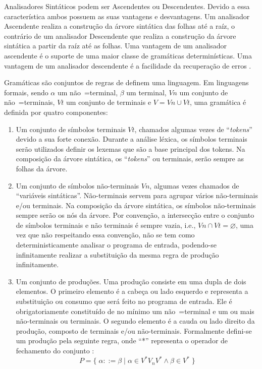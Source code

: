 {    Analisadores Sintáticos podem ser Ascendentes ou Descendentes.
    Devido a essa característica ambos possuem as suas vantagens e
    desvantagens.
    Um analisador Ascendente realiza a construção da árvore sintática das folhas até a raíz,
    o contrário de um analisador Descendente que realiza a construção
    da árvore sintática a partir da raíz até as folhas.
    Uma vantagem de um analisador ascendente é o suporte
    de uma maior classe de gramáticas determinísticas.
    Uma vantagem de um analisador descendente é a facilidade
    da recuperação de erros \cite{ahoCompilerDragonBook}.

    Gramáticas são conjuntos de regras de definem uma linguagem.
    Em linguagens formais,
    sendo $\alpha$ um não~=terminal,
    $\beta$ um terminal,
    $Vn$ um conjunto de não~=terminais,
    $Vt$ um conjunto de terminais e
    $V = Vn \cup Vt$,
    uma gramática é definida por quatro componentes:
    \begin{enumerate}%
        \item Um conjunto de símbolos terminais $Vt$,
        chamados algumas vezes de ``\textit{tokens}'' devido a sua forte conexão.
        Durante a análise léxica,
        os símbolos terminais serão utilizados definir os lexemas que são a base principal dos tokens.
        Na composição da árvore sintática,
        os ``\textit{tokens}'' ou terminais,
        serão sempre as folhas da árvore.

        \item Um conjunto de símbolos não-terminais $Vn$,
        algumas vezes chamados de ``variáveis sintáticas''.
        Não-terminais servem para agrupar vários não-terminais e/ou terminais.
        Na composição da árvore sintática,
        os símbolos não-terminais sempre serão os nós da árvore.
        Por convenção,
        a intersecção entre o conjunto de símbolos terminais e
        não terminais é sempre vazia, i.e., $Vn \cap Vt = \varnothing$,
        uma vez que não respeitando essa convenção,
        não se tem como deterministicamente analisar o programa de entrada,
        podendo-se infinitamente realizar a substituição da mesma regra de produção infinitamente.

        \item \label{definicaoDeGramatica}Um conjunto de produções.
        Uma produção consiste em uma dupla de dois elementos.
        O primeiro elemento é a cabeça ou lado esquerdo e
        representa a substituição ou consumo que será feito no programa de entrada.
        Ele é obrigatoriamente constituído de no mínimo um não~=terminal e
        um ou mais não-terminais ou terminais.
        O segundo elemento é a cauda ou lado direito da produção,
        composto de terminais e/ou não-terminais.
        Formalmente defini-se um produção pela seguinte regra,
        onde ``*'' representa o operador de fechamento do conjunto \cite{hopcroftBook}:
        $$ P = \{\; \alpha ::= \beta \;|\; \alpha \in V^* V_n V^* \land \beta \in V^* \;\} $$


\end{enumerate}}
